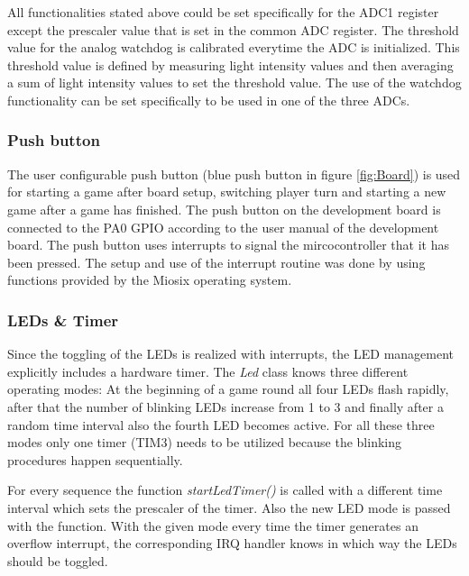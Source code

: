All functionalities stated above could be set specifically for the ADC1 register except the prescaler value that is set in the common ADC register. The threshold value for the analog watchdog is calibrated everytime the ADC is initialized. This threshold value is defined by measuring light intensity values and then averaging a sum of light intensity values to set the threshold value. The use of the watchdog functionality can be set specifically to be used in one of the three ADCs.

\subsubsection{Push button}
The user configurable push button (blue push button in figure \ref{fig:Board}) is used for starting a game after board setup, switching player turn and starting a new game after a game has finished. The push button on the development board is connected to the PA0 GPIO according to the user manual \cite{UsrManual} of the development board. The push button uses interrupts to signal the mircocontroller that it has been pressed. The setup and use of the interrupt routine was done by using functions provided by the Miosix operating system.

\subsubsection{LEDs \& Timer}
Since the toggling of the LEDs is realized with interrupts, the LED management explicitly includes a hardware timer. The \emph{Led} class knows three different operating modes: At the beginning of a game round all four LEDs flash rapidly, after that the number of blinking LEDs increase from 1 to 3 and finally after a random time interval also the fourth LED becomes active. For all these three modes only one timer (TIM3) needs to be utilized because the blinking procedures happen sequentially.\\
\par
For every sequence the function \emph{startLedTimer()} is called with a different time interval which sets the prescaler of the timer. Also the new LED mode is passed with the function. With the given mode every time the timer generates an overflow interrupt, the corresponding IRQ handler knows in which way the LEDs should be toggled.

